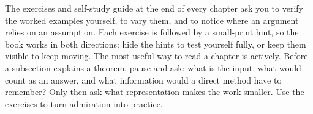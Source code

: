 \documentclass[11pt,oneside]{book}
\begin{document}
The exercises and self-study guide at the end of every chapter ask you to verify the worked examples yourself, to vary them, and to notice where an argument relies on an assumption. Each exercise is followed by a small-print hint, so the book works in both directions: hide the hints to test yourself fully, or keep them visible to keep moving. The most useful way to read a chapter is actively. Before a subsection explains a theorem, pause and ask: what is the input, what would count as an answer, and what information would a direct method have to remember? Only then ask what representation makes the work smaller. Use the exercises to turn admiration into practice.

\tableofcontents
\mainmatter












\backmatter
\end{document}
